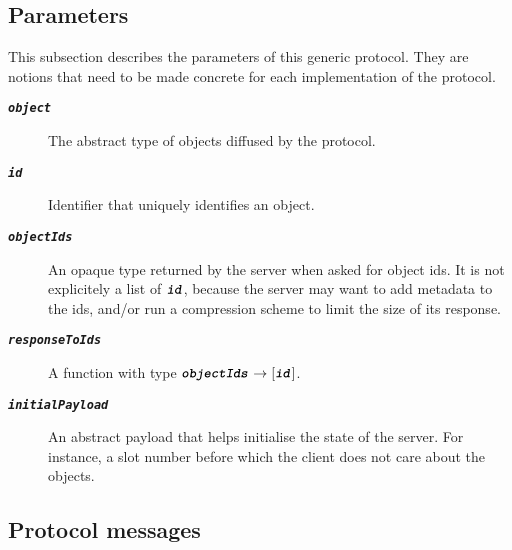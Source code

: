 \subsection{Parameters}

This subsection describes the parameters of this generic protocol. They are
notions that need to be made concrete for each implementation of the protocol.

\newcommand\argfont[1]{\textbf{\texttt{\textit{#1}}}}

\begin{description}
\item [\argfont{object}] The abstract type of objects diffused by the protocol.
\item [\argfont{id}] Identifier that uniquely identifies an object.
\item [\argfont{objectIds}] An opaque type returned by the server when asked for object ids.
  It is not explicitely a list of $\argfont{id}$, because the server may want to add metadata to the ids,
  and/or run a compression scheme to limit the size of its response.
\item [\argfont{responseToIds}] A function with type $\argfont{objectIds} \rightarrow [\argfont{id}]$.
\item [\argfont{initialPayload}] An abstract payload that helps initialise the
  state of the server. For instance, a slot number before which the client does
  not care about the objects.
\end{description}

\subsection{Protocol messages}


